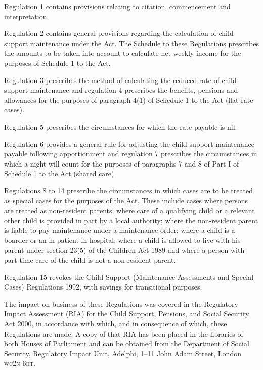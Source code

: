 \documentclass[12pt,a4paper]{article}
\begin{document}
Regulation 1 contains provisions relating to citation, commencement and interpretation.

Regulation 2 contains general provisions regarding the calculation of child support maintenance under the Act. The Schedule to these Regulations prescribes the amounts to be taken into account to calculate net weekly income for the purposes of Schedule 1 to the Act.

Regulation 3 prescribes the method of calculating the reduced rate of child support maintenance and regulation 4 prescribes the benefits, pensions and allowances for the purposes of paragraph 4(1) of Schedule 1 to the Act (flat rate cases).

Regulation 5 prescribes the circumstances for which the rate payable is nil.

Regulation 6 provides a general rule for adjusting the child support maintenance payable following apportionment and regulation 7 prescribes the circumstances in which a night will count for the purposes of paragraphs 7 and 8 of Part I of Schedule 1 to the Act (shared care).

Regulations 8 to 14 prescribe the circumstances in which cases are to be treated as special cases for the purposes of the Act. These include cases where persons are treated as non-resident parents; where care of a qualifying child or a relevant other child is provided in part by a local authority; where the non-resident parent is liable to pay maintenance under a maintenance order; where a child is a boarder or an in-patient in hospital; where a child is allowed to live with his parent under section 23(5) of the Children Act 1989 and where a person with part-time care of the child is not a non-resident parent.

Regulation 15 revokes the Child Support (Maintenance Assessments and Special Cases) Regulations 1992, with savings for transitional purposes.

The impact on business of these Regulations was covered in the Regulatory Impact Assessment (RIA) for the Child Support, Pensions, and Social Security Act 2000, in accordance with which, and in consequence of which, these Regulations are made. A copy of that RIA has been placed in the libraries of both Houses of Parliament and can be obtained from the Department of Social Security, Regulatory Impact Unit, Adelphi, 1--11 John Adam Street, London \textsc{\lowercase{WC2N 6HT}}. 
\end{document}
